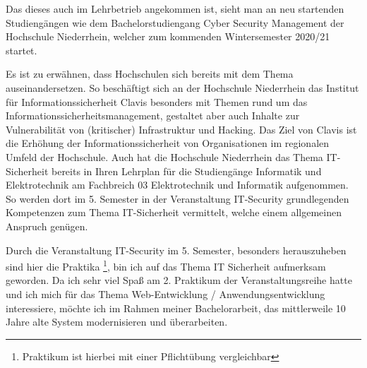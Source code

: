 Das dieses auch im Lehrbetrieb angekommen ist, sieht man an neu startenden Studiengängen wie dem Bachelorstudiengang Cyber Security Management der Hochschule Niederrhein, welcher zum kommenden Wintersemester 2020/21 startet.\cite{HackernRoteKarte2020}

Es ist zu erwähnen, dass Hochschulen sich bereits mit dem Thema auseinandersetzen. 
So beschäftigt sich an der Hochschule Niederrhein das Institut für Informationssicherheit Clavis besonders mit Themen rund um das Informationssicherheitsmanagement, gestaltet aber auch Inhalte zur Vulnerabilität von (kritischer) Infrastruktur und Hacking.
Das Ziel von Clavis ist die Erhöhung der Informationssicherheit von Organisationen im regionalen Umfeld der Hochschule.
\cite{FlyerInstitutClavis}
Auch hat die Hochschule Niederrhein das Thema IT-Sicherheit bereits in Ihren Lehrplan für die Studiengänge Informatik und Elektrotechnik am Fachbreich 03 Elektrotechnik und Informatik aufgenommen. So werden dort im 5. Semester in der Veranstaltung IT-Security grundlegenden Kompetenzen zum Thema IT-Sicherheit vermittelt, welche einem allgemeinen Anspruch genügen.\cite{ModulhandbuchVollzeitBA2019}

Durch die Veranstaltung IT-Security im 5. Semester, besonders herauszuheben sind hier die Praktika \footnote{Praktikum ist hierbei mit einer Pflichtübung vergleichbar}, bin ich auf das Thema IT Sicherheit aufmerksam geworden. Da ich sehr viel Spaß am 2. Praktikum  der Veranstaltungsreihe hatte und ich mich für das Thema Web-Entwicklung / Anwendungsentwicklung interessiere, möchte ich im Rahmen meiner Bachelorarbeit, das mittlerweile 10 Jahre alte System modernisieren und überarbeiten.